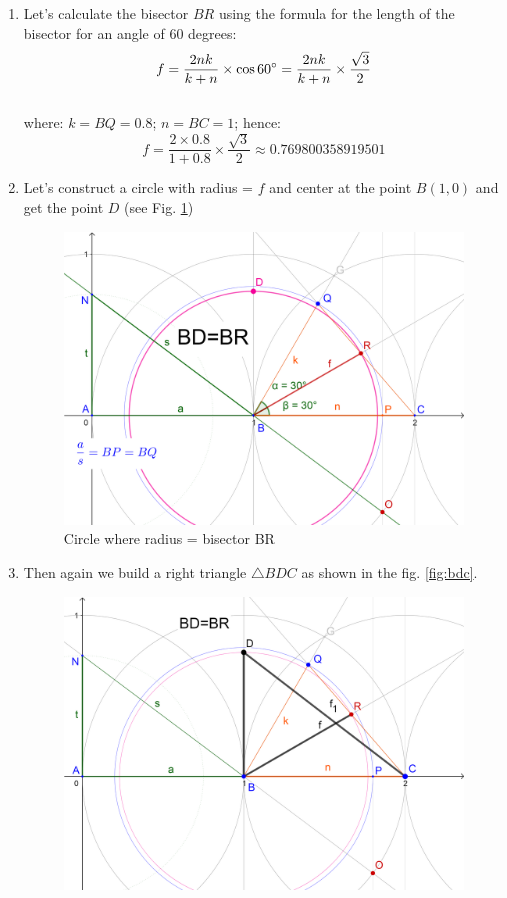 \documentclass[12pt, letterpaper, oneside]{report}
\begin{document}
\begin{enumerate}
	\item Let's calculate the bisector $BR$ using the formula for the length of the bisector for an angle of 60 degrees:	
\begin{equation}
f=\frac{2nk}{k+n}\times \cos 60\degree = \frac{2nk}{k+n}\times\frac{\sqrt{3}}{2}
\end{equation}\\
	where:  $k=BQ=0.8$; $n=BC=1$; hence:
\begin{equation}	
f=\frac{2\times0.8}{1+0.8}\times\frac{\sqrt{3}}{2}\approx 0.769800358919501
\end{equation}
	\item Let's construct a circle with radius = $f$ and center at the point $B(1,0)$ and get the point $D$ (see Fig. \ref{circle})
\begin{figure}[h]
	\centerline{\includegraphics[scale=0.2]{img/bdBR.png}}
	\caption{Circle where radius = bisector BR}
	\label{circle}
\end{figure} 	
\newpage
	\item Then again we build a right triangle $\triangle BDC$ as shown in the fig. \ref{fig:bdc}.
\begin{figure}[h]
	\centerline{\includegraphics[scale=0.14]{img/BDC.png}}

\end{figure}
\end{enumerate}
\end{document}
